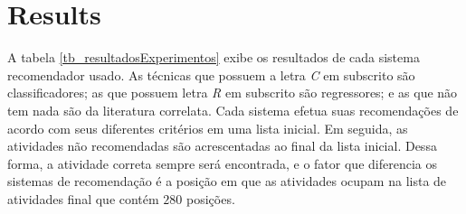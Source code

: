 \documentclass[10pt]{article}
\begin{document}
\section*{Results}\label{sec:result}
A tabela \ref{tb_resultadosExperimentos} exibe os resultados de cada sistema recomendador usado. As técnicas que possuem a letra \emph{C} em subscrito são classificadores; as que possuem letra \emph{R} em subscrito são regressores; e as que não tem nada são da literatura correlata. Cada sistema efetua suas recomendações de acordo com seus diferentes critérios em uma lista inicial. Em seguida, as atividades não recomendadas são acrescentadas ao final da lista inicial. Dessa forma, a atividade correta sempre será encontrada, e o fator que diferencia os sistemas de recomendação é a posição em que as atividades ocupam na lista de atividades final que contém \(280\) posições.
\bgroup
\end{document}
